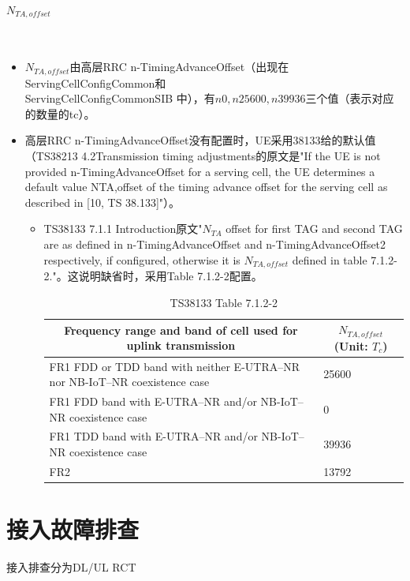 \documentclass{article}
\begin{document}
\paragraph{$N_{TA,offset}$}\mbox{}\\
\begin{itemize}
\item $N_{TA,offset}$由高层RRC n-TimingAdvanceOffset（出现在ServingCellConfigCommon和\\
ServingCellConfigCommonSIB 中），有$n0, n25600, n39936$三个值（表示对应的数量的tc）\cite{38331}。
\item 高层RRC n-TimingAdvanceOffset没有配置时，UE采用38133给的默认值（TS38213 4.2Transmission timing adjustments的原文是"If the UE is not provided n-TimingAdvanceOffset for a serving cell, the UE determines a default value NTA,offset of the timing advance offset for the serving cell as described in [10, TS 38.133]"）\cite{38213}。
\begin{itemize}
\item TS38133 7.1.1	Introduction原文"$N_{TA}$ offset for first TAG and second TAG are as defined in n-TimingAdvanceOffset and n-TimingAdvanceOffset2 respectively, if configured, otherwise it is $N_{TA,offset}$ defined in table 7.1.2-2."\cite{38133}。这说明缺省时，采用Table 7.1.2-2配置。

\begin{longtable}{|p{}|p{}|}
\caption{TS38133 Table 7.1.2-2\cite{38133}}\\
\hline
\multicolumn{1}{|c|}{Frequency range and band of cell used for uplink transmission} & \multicolumn{1}{c|}{$N_{TA,offset}$(Unit: $T_c$)} \\ \hline
FR1 FDD or TDD band with neither E-UTRA–NR nor NB-IoT–NR coexistence case & 25600 \\ \hline
FR1 FDD band with E-UTRA–NR and/or NB-IoT–NR coexistence case & 0 \\ \hline
FR1 TDD band with E-UTRA–NR and/or NB-IoT–NR coexistence case & 39936 \\ \hline
FR2 & 13792 \\ \hline
\end{longtable}

\end{itemize}

\end{itemize}




\section{接入故障排查}
接入排查分为DL/UL RCT
\end{document}
